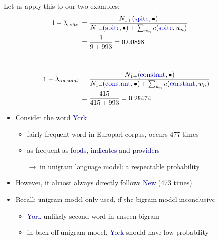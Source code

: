 \documentclass[landscape]{slides}
\newcommand{\example}[1]{\textcolor{darkblue}{\rm #1}}
\newcommand{\maths}[1]{\textcolor{purple}{#1}}
\begin{document}
\vspace{10mm}
Let us apply this to our two examples:
\maths{\begin{equation*}
\begin{split}
1-\lambda_{\text{\em spite}} \;&= \frac{N_{1+}(\text{\example{spite}},\bullet)}{N_{1+}(\text{\example{spite}},\bullet) + \sum_{w_n} c(\text{\example{spite}},w_n)}\\
&= \frac{9}{9+993} = 0.00898\\[10mm]
1-\lambda_{\text{\em constant}} \;&= \frac{N_{1+}(\text{\example{constant}},\bullet)}{N_{1+}(\text{\example{constant}},\bullet) + \sum_{w_n} c(\text{\example{constant}},w_n)}\\
&= \frac{415}{415+993} = 0.29474
\end{split}
\end{equation*}}



\vspace{10mm}
\begin{itemize}
\item Consider the word \example{York}
\begin{itemize} 
\item fairly frequent word in Europarl corpus, occurs 477 times 
\item as frequent as \example{foods}, \example{indicates} and \example{providers}
\item[$\rightarrow$] in unigram language model: a respectable probability
\end{itemize}
\item However, it almost always directly follows \example{New} (473 times)
\item Recall: unigram model only used, if the bigram model inconclusive
\begin{itemize}
\item \example{York} unlikely second word in unseen bigram
\item in back-off unigram model, \example{York} should have low probability
\end{itemize}
\end{itemize}

\end{document}
